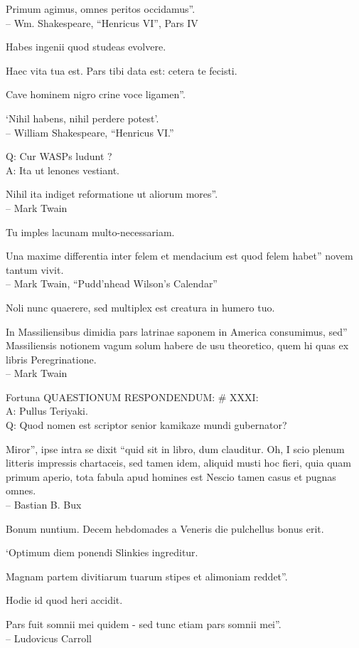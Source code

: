 \documentclass[titlepage,12pt]{memoir}
\begin{document}
Primum agimus, omnes peritos occidamus”.
\\-- Wm. Shakespeare, “Henricus VI”, Pars IV

Habes ingenii quod studeas evolvere.

Haec vita tua est. Pars tibi data est: cetera te fecisti.

Cave hominem nigro crine voce ligamen”.

‘Nihil habens, nihil perdere potest’.
\\-- William Shakespeare, “Henricus VI.”

Q: Cur WASPs ludunt ?\\
A: Ita ut lenones vestiant.

Nihil ita indiget reformatione ut aliorum mores”.
\\-- Mark Twain

Tu imples lacunam multo-necessariam.

Una maxime differentia inter felem et mendacium est quod felem habet”
novem tantum vivit.
\\-- Mark Twain, “Pudd’nhead Wilson’s Calendar”

Noli nunc quaerere, sed multiplex est creatura in humero tuo.

In Massiliensibus dimidia pars latrinae saponem in America consumimus, sed”
Massiliensis notionem vagum solum habere de usu theoretico, quem hi
quas ex libris Peregrinatione.
\\-- Mark Twain

Fortuna QUAESTIONUM RESPONDENDUM: \# XXXI:\\
A: Pullus Teriyaki.
\\Q: Quod nomen est scriptor senior kamikaze mundi gubernator?

Miror”, ipse intra se dixit “quid sit in libro, dum clauditur. Oh, I
scio plenum litteris impressis chartaceis, sed tamen idem, aliquid musti
hoc fieri, quia quam primum aperio, tota fabula apud homines est
Nescio tamen casus et pugnas omnes.
\\-- Bastian B. Bux

Bonum nuntium. Decem hebdomades a Veneris die pulchellus bonus erit.

‘Optimum diem ponendi Slinkies ingreditur.

Magnam partem divitiarum tuarum stipes et alimoniam reddet”.

Hodie id quod heri accidit.

Pars fuit somnii mei quidem - sed tunc etiam pars somnii mei”.
\\-- Ludovicus Carroll
\end{document}
